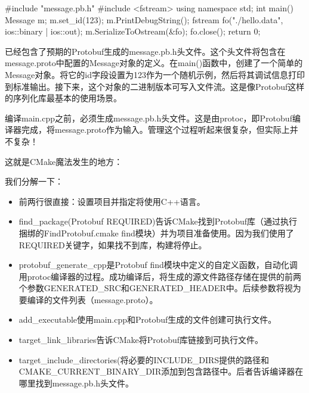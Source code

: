 
\begin{cpp}
#include "message.pb.h"
#include <fstream>
using namespace std;
int main()
{
    Message m;
    m.set_id(123);
    m.PrintDebugString();
    fstream fo("./hello.data", ios::binary | ios::out);
    m.SerializeToOstream(&fo);
    fo.close();
    return 0;
}
\end{cpp}

已经包含了预期的Protobuf生成的message.pb.h头文件。这个头文件将包含在message.proto中配置的Message对象的定义。在main()函数中，创建了一个简单的Message对象。将它的id字段设置为123作为一个随机示例，然后将其调试信息打印到标准输出。接下来，这个对象的二进制版本可写入文件流。这是像Protobuf这样的序列化库最基本的使用场景。

编译main.cpp之前，必须生成message.pb.h头文件。这是由protoc，即Protobuf编译器完成，将message.proto作为输入。管理这个过程听起来很复杂，但实际上并不复杂！

这就是CMake魔法发生的地方：



我们分解一下：

\begin{itemize}
\item
前两行很直接：设置项目并指定将使用C++语言。

\item
find\_package(Protobuf REQUIRED)告诉CMake找到Protobuf库（通过执行捆绑的FindProtobuf.cmake find模块）并为项目准备使用。因为我们使用了REQUIRED关键字，如果找不到库，构建将停止。

\item
protobuf\_generate\_cpp是Protobuf find模块中定义的自定义函数，自动化调用protoc编译器的过程。成功编译后，将生成的源文件路径存储在提供的前两个参数GENERATED\_SRC和GENERATED\_HEADER中。后续参数将视为要编译的文件列表（message.proto）。

\item
add\_executable使用main.cpp和Protobuf生成的文件创建可执行文件。

\item
target\_link\_libraries告诉CMake将Protobuf库链接到可执行文件。

\item
target\_include\_directories(将必要的INCLUDE\_DIRS提供的路径和CMAKE\_CURRENT\_BINARY\_DIR添加到包含路径中。后者告诉编译器在哪里找到message.pb.h头文件。
\end{itemize}

